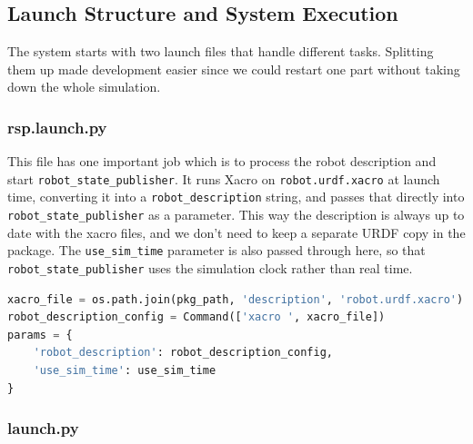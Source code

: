 \subsection{Launch Structure and System Execution}

The system starts with two launch files that handle different tasks. Splitting them up made development easier since we could restart one part without taking down the whole simulation.

\subsubsection{rsp.launch.py}

This file has one important job which is to process the robot description and start \texttt{robot\_state\_publisher}. It runs Xacro on \texttt{robot.urdf.xacro} at launch time, converting it into a \texttt{robot\_description} string, and passes that directly into \texttt{robot\_state\_publisher} as a parameter. This way the description is always up to date with the xacro files, and we don't need to keep a separate URDF copy in the package. The \texttt{use\_sim\_time} parameter is also passed through here, so that \texttt{robot\_state\_publisher} uses the simulation clock rather than real time.

\begin{lstlisting}[language=Python, caption={Robot description setup in rsp.launch.py}]
xacro_file = os.path.join(pkg_path, 'description', 'robot.urdf.xacro')
robot_description_config = Command(['xacro ', xacro_file])
params = {
    'robot_description': robot_description_config,
    'use_sim_time': use_sim_time
}
\end{lstlisting}

\subsubsection{launch.py}

